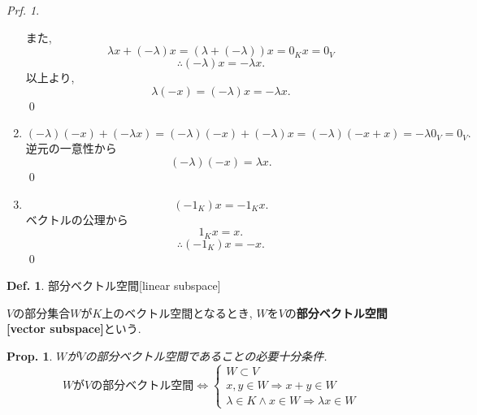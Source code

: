 \documentclass[a4paper,10pt,report]{amsart}
\theoremstyle{plain}
\newtheorem{prop}{Prop.}[section]
\theoremstyle{definition}
\newtheorem{defn}{Def.}[section]
\theoremstyle{remark}
\newtheorem{prf}{Prf.}
\begin{document}
\begin{prf}
\begin{enumerate}
        また, 
        \begin{equation*}
            \lambda x+(-\lambda)x=(\lambda+(-\lambda))x=0_{K}x=0_{V}
        \end{equation*}
        \begin{equation*}
            \therefore(-\lambda)x=-\lambda{}x.
        \end{equation*}
        以上より, 
        \begin{equation*}
            \lambda(-x)=(-\lambda)x=-\lambda x. 
        \end{equation*}
        \qed{}
        \item 
        \begin{equation*}
            (-\lambda)(-x)+(-\lambda x)=(-\lambda)(-x)+(-\lambda)x=(-\lambda)(-x+x)=-\lambda0_{V}=0_{V}. 
        \end{equation*}
        逆元の一意性から
        \begin{equation*}
            (-\lambda)(-x)=\lambda x.
        \end{equation*}
        \qed{}
        \item 
        \begin{equation*}
            (-1_{K})x=-1_{K}x.
        \end{equation*}
        ベクトルの公理から
        \begin{equation*}
            1_{K}x=x.
        \end{equation*}
        \begin{equation*}
            \therefore(-1_{K})x=-x.
        \end{equation*}
        \qed{}
    \end{enumerate}
\end{prf}
\begin{leftbar}
    \begin{defn}部分ベクトル空間[linear subspace]\par
        \(V\)の部分集合\(W\)が\(K\)上のベクトル空間となるとき, 
        \(W\)を\(V\)の\textbf{部分ベクトル空間[vector subspace]}という.
    \end{defn}
\end{leftbar}
\begin{leftbar}
    \begin{prop}\(W\)が\(V\)の部分ベクトル空間であることの必要十分条件.
        \begin{equation*}
            \mbox{\(W\)が\(V\)の部分ベクトル空間}\Leftrightarrow
            \begin{cases}
                W\subset V\\
                x, y\in W\Rightarrow x+y\in W\\
                \lambda\in K\wedge x\in W\Rightarrow \lambda x\in W
            \end{cases}
        \end{equation*}\label{prop:NSC_for_linear_subspace_1}
    \end{prop}
\end{leftbar}
\end{document}
